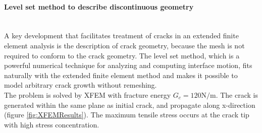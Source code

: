 \documentclass[preprint,review,12pt]{elsarticle}
\begin{document}
\paragraph{Level set method to describe discontinuous geometry}
\
\\
A key development that facilitates treatment of cracks in an extended finite element analysis is the description of crack geometry, because the mesh is not required to conform to the crack geometry. The level set method, which is a powerful numerical technique for analyzing and computing interface motion, fits naturally with the extended finite element method and makes it possible to model arbitrary crack growth without remeshing.
\
\\
The problem is solved by XFEM with fracture energy $G_{c}=120 \textrm{N/m}$. The crack is generated within the same plane as initial crack, and propagate along x-direction (figure \ref{fig:XFEMResults}). The maximum tensile stress occurs at the crack tip with high stress concentration.
\
\\
\end{document}
